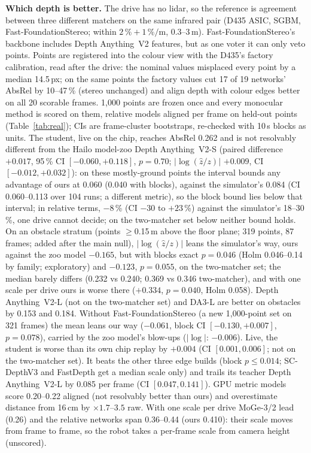 \documentclass[conference]{IEEEtran}
\newcommand{\dav}{Depth Anything~V2}
\begin{document}
\textbf{Which depth is better.} The drive has no lidar, so the reference is agreement between three different matchers on the
same infrared pair (D435 ASIC, SGBM, Fast-FoundationStereo; within $2\,\%+1\,\%/\mathrm{m}$, 0.3--3\,m). Fast-FoundationStereo's
backbone includes \dav{} features, but as one voter it can only veto points. Points are registered into the colour view with the D435's factory calibration, read after the drive: the
nominal values misplaced every point by a median 14.5\,px; on the same points the factory values cut 17 of 19 networks' AbsRel by
10--47\,\% (stereo unchanged) and align depth with colour edges better on all 20 scorable frames.
1{,}000 points are frozen once and every monocular method is scored on them, relative models aligned per frame on
held-out points (Table~\ref{tab:real}); CIs are frame-cluster bootstraps, re-checked with 10\,s blocks as units. The student,
live on the chip, reaches AbsRel 0.262 and is not resolvably different from the Hailo model-zoo \dav-S (paired difference
$+0.017$, 95\,\% CI $[-0.060, +0.118]$, $p=0.70$; $|\log(\hat z/z)|$ $+0.009$, CI $[-0.012, +0.032]$): on these
mostly-ground points the interval bounds any advantage of ours at 0.060 (0.040 with blocks), against the simulator's 0.084 (CI 0.060--0.113 over
104 runs; a different metric), so the block bound lies below that interval; in relative terms, $-8$\,\% (CI $-30$ to $+23$\,\%)
against the simulator's 18--30\,\%, one drive cannot decide; on the two-matcher set below neither bound holds. On an obstacle stratum (points
$\ge$0.15\,m above the floor plane; 319 points, 87 frames; added after the main null), $|\log(\hat z/z)|$ leans the
simulator's way, ours against the zoo model $-0.165$, but with blocks exact $p=0.046$ (Holm 0.046--0.14 by family; exploratory) and $-0.123$, $p=0.055$, on the
two-matcher set; the median barely differs (0.232 vs 0.240; 0.369 vs 0.346 two-matcher), and with one scale per drive ours is worse there ($+0.334$,
$p=0.040$, Holm 0.058). \dav-L (not on the two-matcher set) and DA3-L are better on obstacles by 0.153 and 0.184. Without Fast-FoundationStereo (a new 1{,}000-point set on 321 frames) the mean leans our
way ($-0.061$, block CI $[-0.130, +0.007]$, $p=0.078$), carried by the zoo model's blow-ups ($|\log|$: $-0.006$). Live, the student is worse than its own chip replay by $+0.004$ (CI $[0.001, 0.006]$; not on the two-matcher set). It
beats the other three edge builds (block $p\le0.014$; SC-DepthV3 and FastDepth get a median scale only) and trails its teacher
\dav-L by 0.085 per frame (CI $[0.047, 0.141]$). GPU metric models score 0.20--0.22 aligned (not resolvably better
than ours) and overestimate distance from 16\,cm by $\times1.7$--$3.5$ raw. With one scale per drive MoGe-3/2 lead (0.26) and the relative networks span 0.36--0.44 (ours 0.410): their scale moves
from frame to frame, so the robot takes a per-frame scale from camera height (unscored).
\end{document}
